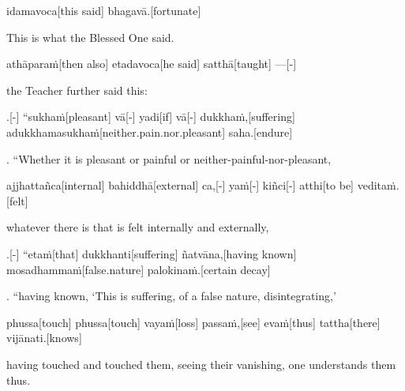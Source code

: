 \begin{samepage}
\begingl[glneveryline={\PaliGlossA,\PaliGlossB}]
idamavoca[this said] bhagavā.[fortunate]
\endgl
\nopagebreak
\linespread{0.5}
\begin{spacin}{0.2}
{\PaliGlossFT This is what the Blessed One said.}
\end{spacin}
\vskip 12pt
\end{samepage}
\begin{samepage}
\begingl[glneveryline={\PaliGlossA,\PaliGlossB}]
athāparaṁ[then also] etadavoca[he said] satthā[taught] —[-]
\endgl
\nopagebreak
\linespread{0.5}
\begin{spacin}{0.2}
{\PaliGlossFT the Teacher further said this:}
\end{spacin}
\vskip 12pt
\end{samepage}
\vskip 0.2in
\begin{samepage}
.[-] “sukhaṁ[pleasant] vā[-] yadi[if] vā[-] dukkhaṁ,[suffering] adukkhamasukhaṁ[neither.pain.nor.pleasant] saha.[endure]
\endgl
\nopagebreak
\linespread{0.5}
\begin{spacin}{0.2}
{. “Whether it is pleasant or painful  or neither-painful-nor-pleasant,}
\end{spacin}
\vskip 12pt
\end{samepage}
\begin{samepage}
\begingl[glneveryline={\PaliGlossA,\PaliGlossB}]
ajjhattañca[internal] bahiddhā[external] ca,[-] yaṁ[-] kiñci[-] atthi[to be] veditaṁ.[felt]
\endgl
\nopagebreak
\linespread{0.5}
\begin{spacin}{0.2}
{\PaliGlossFT whatever there is that is felt internally and externally,}
\end{spacin}
\vskip 12pt
\end{samepage}
\begin{samepage}
.[-] “etaṁ[that] dukkhanti[suffering] ñatvāna,[having known] mosadhammaṁ[false.nature] palokinaṁ.[certain decay]
\endgl
\nopagebreak
\linespread{0.5}
\begin{spacin}{0.2}
{. “having known, ‘This is suffering,  of a false nature, disintegrating,’}
\end{spacin}
\vskip 12pt
\end{samepage}
\begin{samepage}
\begingl[glneveryline={\PaliGlossA,\PaliGlossB}]
phussa[touch] phussa[touch] vayaṁ[loss] passaṁ,[see] evaṁ[thus] tattha[there] vijānati.[knows]
\endgl
\nopagebreak
\linespread{0.5}
\begin{spacin}{0.2}
{\PaliGlossFT having touched and touched them, seeing their vanishing, one understands them thus.}
\end{spacin}
\vskip 12pt
\end{samepage}
